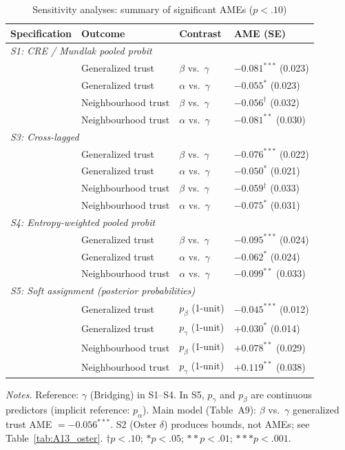 \documentclass[12pt, a4paper]{article}
\newcommand{\tablenote}[1]{\vspace{4pt}\par\footnotesize\textit{Notes.} #1}
\begin{document}
\begin{table}[H]
\centering
\caption{Sensitivity analyses: summary of significant AMEs ($p < .10$)}
\label{tab:A11_comparison}
\small
\begin{tabular}{llll}
\hline\hline
  Specification & Outcome & Contrast & AME (SE) \\
\hline
  \multicolumn{4}{l}{\textit{S1: CRE / Mundlak pooled probit}} \\
  & Generalized trust    & $\beta$ vs.\ $\gamma$ & $-0.081^{***}$ (0.023) \\
  & Generalized trust    & $\alpha$ vs.\ $\gamma$ & $-0.055^{*}$ (0.023) \\
  & Neighbourhood trust  & $\beta$ vs.\ $\gamma$ & $-0.056^{\dagger}$ (0.032) \\
  & Neighbourhood trust  & $\alpha$ vs.\ $\gamma$ & $-0.081^{**}$ (0.030) \\
\hline
  \multicolumn{4}{l}{\textit{S3: Cross-lagged}} \\
  & Generalized trust    & $\beta$ vs.\ $\gamma$ & $-0.076^{***}$ (0.022) \\
  & Generalized trust    & $\alpha$ vs.\ $\gamma$ & $-0.050^{*}$ (0.021) \\
  & Neighbourhood trust  & $\beta$ vs.\ $\gamma$ & $-0.059^{\dagger}$ (0.033) \\
  & Neighbourhood trust  & $\alpha$ vs.\ $\gamma$ & $-0.075^{*}$ (0.031) \\
\hline
  \multicolumn{4}{l}{\textit{S4: Entropy-weighted pooled probit}} \\
  & Generalized trust    & $\beta$ vs.\ $\gamma$ & $-0.095^{***}$ (0.024) \\
  & Generalized trust    & $\alpha$ vs.\ $\gamma$ & $-0.062^{*}$ (0.024) \\
  & Neighbourhood trust  & $\alpha$ vs.\ $\gamma$ & $-0.099^{**}$ (0.033) \\
\hline
  \multicolumn{4}{l}{\textit{S5: Soft assignment (posterior probabilities)}} \\
  & Generalized trust    & $p_{\beta}$ (1-unit)  & $-0.045^{***}$ (0.012) \\
  & Generalized trust    & $p_{\gamma}$ (1-unit) & $+0.030^{*}$ (0.014) \\
  & Neighbourhood trust  & $p_{\beta}$ (1-unit)  & $+0.078^{**}$ (0.029) \\
  & Neighbourhood trust  & $p_{\gamma}$ (1-unit) & $+0.119^{**}$ (0.038) \\
\hline\hline
\end{tabular}
\tablenote{Reference: $\gamma$ (Bridging) in S1--S4. In S5, $p_{\gamma}$ and
$p_{\beta}$ are continuous predictors (implicit reference: $p_{\alpha}$).
Main model (Table~A9): $\beta$ vs.\ $\gamma$ generalized trust AME
$= -0.056^{***}$. S2 (Oster $\delta$) produces bounds, not AMEs; see
Table~\ref{tab:A13_oster}.
$\dagger p<.10$; $* p<.05$; $** p<.01$; $*** p<.001$.}
\end{table}
\end{document}
